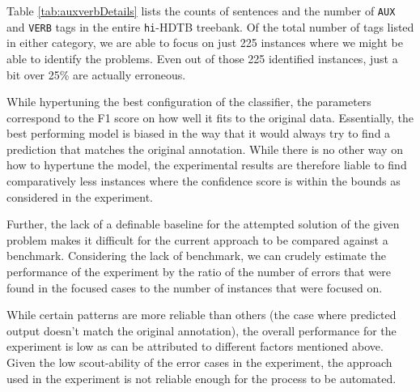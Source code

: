 Table \ref{tab:auxverbDetails} lists the counts of sentences and the number of \verb|AUX| and \verb|VERB| tags in the entire \verb|hi|-HDTB treebank. Of the total number of tags listed in either category, we are able to focus on just 225 instances where we might be able to identify the problems. Even out of those 225 identified instances, just a bit over 25\% are actually erroneous. 

While hypertuning the best configuration of the classifier, the parameters correspond to the F1 score on how well it fits to the original data. Essentially, the best performing model is biased in the way that it would always try to find a prediction that matches the original annotation. While there is no other way on how to hypertune the model, the experimental results are therefore liable to find comparatively less instances where the confidence score is within the bounds as considered in the experiment. 

Further, the lack of a definable baseline for the attempted solution of the given problem makes it difficult for the current approach to be compared against a benchmark. Considering the lack of benchmark, we can crudely estimate the performance of the experiment by the ratio of the number of errors that were found in the focused cases to the number of instances that were focused on. 

While certain patterns are more reliable than others (the case where predicted output doesn't match the original annotation), the overall performance for the experiment is low as can be attributed to different factors mentioned above. Given the low scout-ability of the error cases in the experiment, the approach used in the experiment is not reliable enough for the process to be automated.